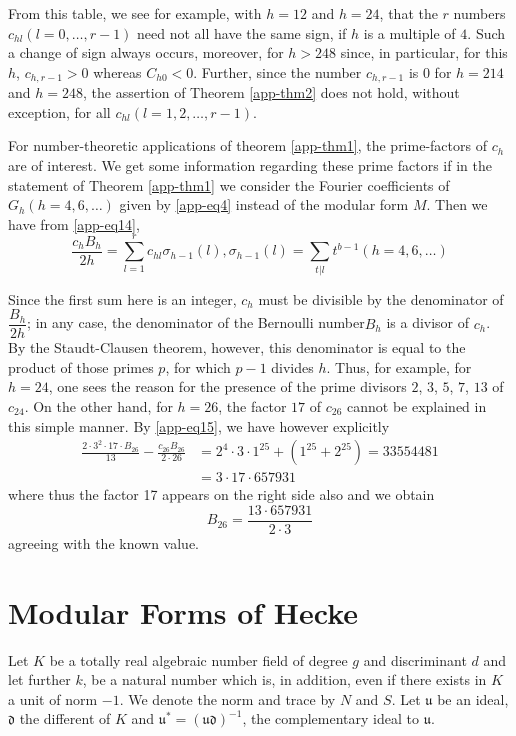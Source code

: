 From this table, we see for example, with $h=12$ and $h=24$, that the
$r$ numbers $c_{hl}(l=0,\ldots,r-1)$ need not all have the same sign,
if $h$ is a multiple of $4$. Such a change of sign always occurs,
moreover, for $h>248$ since, in particular, for this $h$,
$c_{h,r-1}>0$ whereas $C_{h0}<0$. Further, since the number
$c_{h,r-1}$ is $0$ for $h=214$ and $h=248$, the assertion of Theorem
\ref{app-thm2} does not hold, without exception, for all
$c_{hl}(l=1,2,\ldots,r-1)$.


For number-theoretic applications of theorem \ref{app-thm1}, the
prime-factors of $c_{h}$ are of interest. We get some information
regarding these prime factors if in the statement of Theorem
\ref{app-thm1} we consider the Fourier coefficients of
$G_{h}(h=4,6,\ldots)$ given by \eqref{app-eq4} instead of the modular
form $M$. Then we have from \eqref{app-eq14},
\begin{equation*}
\frac{c_{h}B_{h}}{2h}=\sum^{r}_{l=1}c_{hl}\sigma_{h-1}(l),\sigma_{h-1}(l)=\sum_{t|l}t^{b-1}(h=4,6,\ldots)\tag{15}\label{app-eq15} 
\end{equation*}

Since the first sum here is an integer, $c_{h}$ must be divisible by
the denominator of $\dfrac{B_{h}}{2h}$; in any case, the denominator
of the Bernoulli number\pageoriginale $B_{h}$ is a divisor of
$c_{h}$. By the Staudt-Clausen theorem, however, this denominator is
equal to the product of those primes $p$, for which $p-1$ divides $h$.
Thus, for example, for $h=24$, one sees the reason for the presence of
the prime divisors $2$, $3$, $5$, $7$, $13$ of $c_{24}$. On the other
hand, for $h=26$, the factor $17$ of $c_{26}$ cannot be explained in
this simple manner. By \eqref{app-eq15}, we have however explicitly
\begin{align*}
\frac{2\cdot 3^{2}\cdot 17\cdot B_{26}}{13}-\frac{c_{26}B_{26}}{2\cdot
  26} &= 2^{4}\cdot 3\cdot 1^{25}+(1^{25}+2^{25})=33554481\\
&= 3\cdot 17\cdot 657931
\end{align*}
where thus the factor 17 appears on the right side also and we obtain
$$
B_{26}=\frac{13\cdot 657931}{2\cdot 3}
$$
agreeing with the known value.

\section{Modular Forms of Hecke}\label{app-sec2}

Let $K$ be a totally real algebraic number field of degree $g$ and
discriminant $d$ and let further $k$, be a natural number which is,
in addition, even if there exists in $K$ a unit of norm $-1$. We denote
the norm and trace by $N$ and $S$. Let $\mathfrak{u}$ be an ideal,
$\mathfrak{d}$ the different of $K$ and
$\mathfrak{u}^{\ast}=(\mathfrak{u}\mathfrak{d})^{-1}$, the complementary
ideal to $\mathfrak{u}$.

